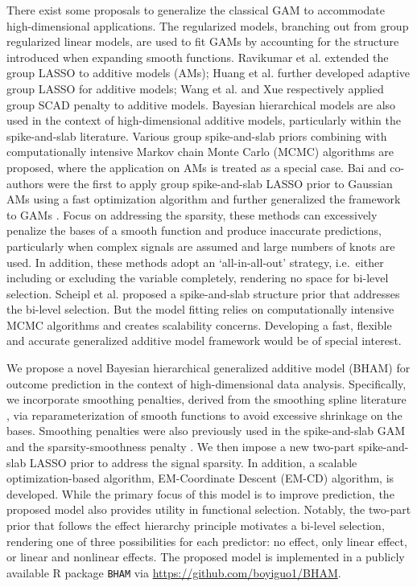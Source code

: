 \documentclass[AMA,STIX1COL,]{WileyNJD-v2}
\begin{document}
There exist some proposals to generalize the classical GAM to
accommodate high-dimensional applications. The regularized models,
branching out from group regularized linear models, are used to fit GAMs
by accounting for the structure introduced when expanding smooth
functions. Ravikumar et al. \citep{Ravikumar2009} extended the group
LASSO \citep{Yuan2006} to additive models (AMs); Huang et al.
\citep{Huang2010} further developed adaptive group LASSO for additive
models; Wang et al. \citep{Wang2007} and Xue \citep{Xue2009}
respectively applied group SCAD penalty \citep{Fan2001} to additive
models. Bayesian hierarchical models are also used in the context of
high-dimensional additive models, particularly within the spike-and-slab
literature. Various group spike-and-slab priors \citep{Xu2015, Yang2020}
combining with computationally intensive Markov chain Monte Carlo (MCMC)
algorithms are proposed, where the application on AMs is treated as a
special case. Bai and co-authors\citep{Bai2020} were the first to apply
group spike-and-slab LASSO prior to Gaussian AMs using a fast
optimization algorithm and further generalized the framework to GAMs
\citep{Bai2021}. Focus on addressing the sparsity, these methods can
excessively penalize the bases of a smooth function and produce
inaccurate predictions, particularly when complex signals are assumed
and large numbers of knots are used. \citep{Scheipl2013} In addition,
these methods adopt an `all-in-all-out' strategy, i.e.~either including
or excluding the variable completely, rendering no space for bi-level
selection. Scheipl et al. \citep{Scheipl2012} proposed a spike-and-slab
structure prior that addresses the bi-level selection. But the model
fitting relies on computationally intensive MCMC algorithms and creates
scalability concerns. Developing a fast, flexible and accurate
generalized additive model framework would be of special interest.

We propose a novel Bayesian hierarchical generalized additive model
(BHAM) for outcome prediction in the context of high-dimensional data
analysis. Specifically, we incorporate smoothing penalties, derived from
the smoothing spline literature \cite{Wood2017}, via reparameterization
of smooth functions to avoid excessive shrinkage on the bases. Smoothing
penalties were also previously used in the spike-and-slab GAM
\cite{Scheipl2012} and the sparsity-smoothness penalty \cite{Meier2009}.
We then impose a new two-part spike-and-slab LASSO prior to address the
signal sparsity. In addition, a scalable optimization-based algorithm,
EM-Coordinate Descent (EM-CD) algorithm, is developed. While the primary
focus of this model is to improve prediction, the proposed model also
provides utility in functional selection. Notably, the two-part prior
that follows the effect hierarchy principle motivates a bi-level
selection, rendering one of three possibilities for each predictor: no
effect, only linear effect, or linear and nonlinear effects. The
proposed model is implemented in a publicly available R package
\texttt{BHAM} via \url{https://github.com/boyiguo1/BHAM}.
\end{document}
